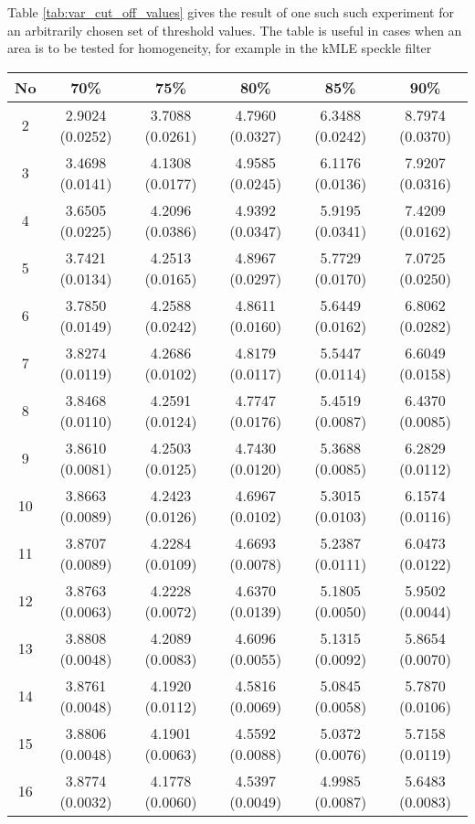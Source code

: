 Table \ref{tab:var_cut_off_values} gives the result of one such such experiment for an arbitrarily chosen set of threshold values.
The table is useful in cases when an area is to be tested for homogeneity,
  for example in the kMLE speckle filter \cite{Le_2010_ACRS}

\begin{table}
\centering

\begin{tabular}{c|c|c|c|c|c}
No  & 70\%            &75\%             &80\%             &85\%             &90\%\\
\hline
2   &2.9024 (0.0252)  &3.7088 (0.0261)  &4.7960 (0.0327)  &6.3488 (0.0242)  &8.7974 (0.0370)\\
3   &3.4698 (0.0141)  &4.1308 (0.0177)  &4.9585 (0.0245)  &6.1176 (0.0136)  &7.9207 (0.0316)\\
4   &3.6505 (0.0225)  &4.2096 (0.0386)  &4.9392 (0.0347)  &5.9195 (0.0341)  &7.4209 (0.0162)\\
5   &3.7421 (0.0134)  &4.2513 (0.0165)  &4.8967 (0.0297)  &5.7729 (0.0170)  &7.0725 (0.0250)\\
6   &3.7850 (0.0149)  &4.2588 (0.0242)  &4.8611 (0.0160)  &5.6449 (0.0162)  &6.8062 (0.0282)\\
7   &3.8274 (0.0119)  &4.2686 (0.0102)  &4.8179 (0.0117)  &5.5447 (0.0114)  &6.6049 (0.0158)\\
8   &3.8468 (0.0110)  &4.2591 (0.0124)  &4.7747 (0.0176)  &5.4519 (0.0087)  &6.4370 (0.0085)\\
9   &3.8610 (0.0081)  &4.2503 (0.0125)  &4.7430 (0.0120)  &5.3688 (0.0085)  &6.2829 (0.0112)\\
10  &3.8663 (0.0089)  &4.2423 (0.0126)  &4.6967 (0.0102)  &5.3015 (0.0103)  &6.1574 (0.0116)\\
11  &3.8707 (0.0089)  &4.2284 (0.0109)  &4.6693 (0.0078)  &5.2387 (0.0111)  &6.0473 (0.0122)\\
12  &3.8763 (0.0063)  &4.2228 (0.0072)  &4.6370 (0.0139)  &5.1805 (0.0050)  &5.9502 (0.0044)\\
13  &3.8808 (0.0048)  &4.2089 (0.0083)  &4.6096 (0.0055)  &5.1315 (0.0092)  &5.8654 (0.0070)\\
14  &3.8761 (0.0048)  &4.1920 (0.0112)  &4.5816 (0.0069)  &5.0845 (0.0058)  &5.7870 (0.0106)\\
15  &3.8806 (0.0048)  &4.1901 (0.0063)  &4.5592 (0.0088)  &5.0372 (0.0076)  &5.7158 (0.0119)\\
16  &3.8774 (0.0032)  &4.1778 (0.0060)  &4.5397 (0.0049)  &4.9985 (0.0087)  &5.6483 (0.0083)\\

\end{tabular}
\end{table}
